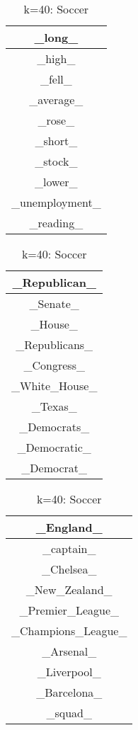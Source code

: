 \documentclass{article}
\begin{document}
\begin{table}[ht]
    \parbox{.25\linewidth}{
    \centering
    \begin{tabular}{|c|}
    \hline
    \_long\_\\
    \hline
    \_high\_\\
    \hline
    \_fell\_\\
    \hline
    \_average\_\\
    \hline
    \_rose\_\\
    \hline
    \_short\_\\
    \hline
    \_stock\_\\
    \hline
    \_lower\_\\
    \hline
    \_unemployment\_\\
    \hline
    \_reading\_\\
    \hline
    \end{tabular}
    \caption{k=40: Economy/Stocks}
    }
    \hfill
    \parbox{.25\linewidth}{
    \centering
    \begin{tabular}{|c|}
    \hline
    \_Republican\_\\
    \hline
    \_Senate\_\\
    \hline
    \_House\_\\
    \hline
    \_Republicans\_\\
    \hline
    \_Congress\_\\
    \hline
    \_White\_House\_\\
    \hline
    \_Texas\_\\
    \hline
    \_Democrats\_\\
    \hline
    \_Democratic\_\\
    \hline
    \_Democrat\_\\
    \hline
    \end{tabular}
    \caption{k=40: U.S Government}
    }
    \hfill
    \parbox{.25\linewidth}{
    \centering
    \begin{tabular}{|c|}
    \hline
    \_England\_\\
    \hline
    \_captain\_\\
    \hline
    \_Chelsea\_\\
    \hline
    \_New\_Zealand\_\\
    \hline
    \_Premier\_League\_\\
    \hline
    \_Champions\_League\_\\
    \hline
    \_Arsenal\_\\
    \hline
    \_Liverpool\_\\
    \hline
    \_Barcelona\_\\
    \hline
    \_squad\_\\
    \hline
    \end{tabular}
    \caption{k=40: Soccer}
    }
\end{table}\\
\end{document}
